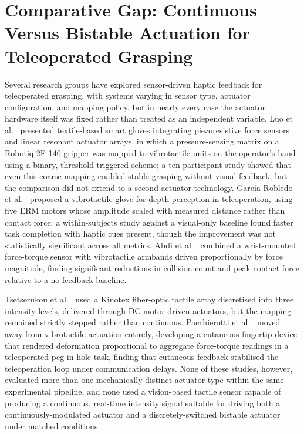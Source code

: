 \documentclass[12pt, a4paper]{report}
\begin{document}
\section{Comparative Gap: Continuous Versus Bistable Actuation for Teleoperated Grasping}
Several research groups have explored sensor-driven haptic feedback for teleoperated grasping, with systems varying in sensor type, actuator configuration, and mapping policy, but in nearly every case the actuator hardware itself was fixed rather than treated as an independent variable. Luo et al.\ \cite{luo2024} presented textile-based smart gloves integrating piezoresistive force sensors and linear resonant actuator arrays, in which a pressure-sensing matrix on a Robotiq 2F-140 gripper was mapped to vibrotactile units on the operator's hand using a binary, threshold-triggered scheme; a ten-participant study showed that even this coarse mapping enabled stable grasping without visual feedback, but the comparison did not extend to a second actuator technology. García-Robledo et al.\ \cite{garciarobledo2011} proposed a vibrotactile glove for depth perception in teleoperation, using five ERM motors whose amplitude scaled with measured distance rather than contact force; a within-subjects study against a visual-only baseline found faster task completion with haptic cues present, though the improvement was not statistically significant across all metrics. Abdi et al.\ \cite{abdi2020} combined a wrist-mounted force-torque sensor with vibrotactile armbands driven proportionally by force magnitude, finding significant reductions in collision count and peak contact force relative to a no-feedback baseline.

Tsetserukou et al.\ \cite{tsetserukou2010} used a Kinotex fiber-optic tactile array discretised into three intensity levels, delivered through DC-motor-driven actuators, but the mapping remained strictly stepped rather than continuous. Pacchierotti et al.\ \cite{pacchierotti2015b} moved away from vibrotactile actuation entirely, developing a cutaneous fingertip device that rendered deformation proportional to aggregate force-torque readings in a teleoperated peg-in-hole task, finding that cutaneous feedback stabilised the teleoperation loop under communication delays. None of these studies, however, evaluated more than one mechanically distinct actuator type within the same experimental pipeline, and none used a vision-based tactile sensor capable of producing a continuous, real-time intensity signal suitable for driving both a continuously-modulated actuator and a discretely-switched bistable actuator under matched conditions.
\end{document}
